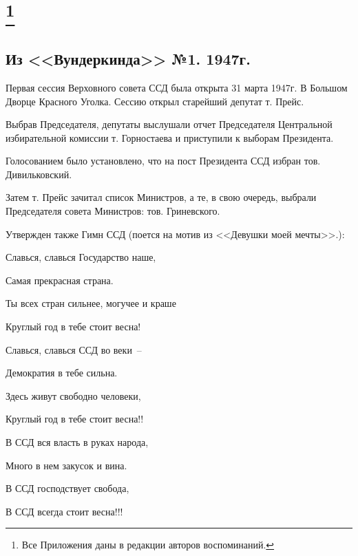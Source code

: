 \singlespacing

\chapter{\protect\footnote{Все Приложения даны в редакции авторов воспоминаний.}}

\section*{Из <<Вундеркинда>> №1. 1947г.}

Первая сессия Верховного совета ССД была открыта 31 марта 1947г. В Большом Дворце Красного Уголка. Сессию открыл старейший депутат т. Прейс.

Выбрав Председателя, депутаты выслушали отчет Председателя Центральной избирательной комиссии т.  Горностаева и приступили к выборам Президента.

Голосованием было установлено, что на пост Президента ССД избран тов. Дивильковский.

Затем т. Прейс зачитал список Министров, а те, в свою очередь, выбрали Председателя совета Министров: тов. Гриневского.

Утвержден также Гимн ССД (поется на мотив из <<Девушки моей мечты>>.):

\vfill

{\itshape

Славься, славься Государство наше,

Самая прекрасная страна.

Ты всех стран сильнее, могучее и краше

Круглый год в тебе стоит весна!

\vfill

Славься, славься ССД во веки~--

Демократия в тебе сильна.

Здесь живут свободно человеки,

Круглый год в тебе стоит весна!!

\vfill

В ССД вся власть в руках народа,

Много в нем закусок и вина.

В ССД господствует свобода,

В ССД всегда стоит весна!!!

}

\onehalfspacing


